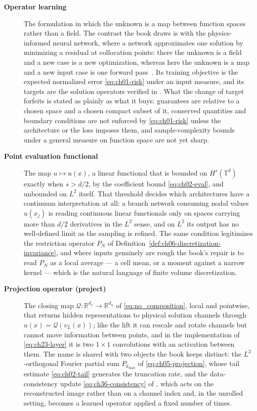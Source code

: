 \begin{description}
\item[\textbf{Operator learning}] The formulation in which the unknown is a map between
function spaces rather than a field. The contrast the book draws is with the
physics-informed neural network, where a network approximates one solution by minimizing a
residual at collocation points: there the unknown is a field and a new case is a new
optimization, whereas here the unknown is a map and a new input case is one forward
pass~\cite{kovachki2023neural, lu2021learning}. Its training objective is the expected
normalized error \eqref{eq:ch01-risk} under an input measure, and its targets are the
solution operators verified in .
What the change of target forfeits is stated as plainly as what it buys: guarantees are
relative to a chosen space and a chosen compact subset of it, conserved quantities and
boundary conditions are not enforced by \eqref{eq:ch01-risk} unless the architecture or the
loss imposes them, and sample-complexity bounds under a general measure on function space
are not yet sharp. 

\item[\textbf{Point evaluation functional}] The map $u \mapsto u(x)$, a linear functional
that is bounded on $H^{s}(\mathbb{T}^{d})$ exactly when $s > d/2$, by the coefficient bound
\eqref{eq:ch02-eval}, and unbounded on $L^{2}$ itself. That threshold decides which
architectures have a continuum interpretation at all: a branch network consuming nodal
values $u(x_{j})$ is reading continuous linear functionals only on spaces carrying more
than $d/2$ derivatives in the $L^{2}$ sense, and on $L^{2}$ its output has no well-defined
limit as the sampling is refined. The same condition legitimizes the restriction operator
$P_{N}$ of Definition~\ref{def:ch06-discretization-invariance}, and where inputs genuinely
are rough the book's repair is to read $P_{N}$ as a local average --- a cell mean, or a
moment against a narrow kernel --- which is the natural language of finite volume
discretization. 

\item[\textbf{Projection operator (project)}] The closing map $\mathcal{Q} :
\mathbb{R}^{d_{v}} \to \mathbb{R}^{d_{u}}$ of \eqref{eq:no_composition}, local and
pointwise, that returns hidden representations to physical solution channels through
$u(x) = \mathcal{Q}(v_{L}(x))$; like the lift it can rescale and rotate channels but
cannot move information between points, and in the implementation of
\eqref{eq:ch23-layer} it is two $1 \times 1$ convolutions with an activation between
them. The name is shared with two objects the book keeps distinct:
the $L^{2}$-orthogonal Fourier partial sum $P_{k_{\max}}$ of \eqref{eq:ch05-projection},
whose tail estimate \eqref{eq:ch02-tail} generates the truncation rate, and the
data-consistency update \eqref{eq:ch36-consistency} of
, which acts on the
reconstructed image rather than on a channel index and, in the unrolled setting,
becomes a learned operator applied a fixed number of times.


\end{description}
